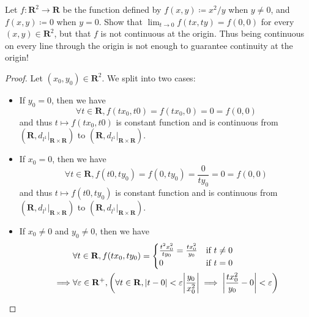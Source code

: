 \begin{exercise}\label{ex 2.2.12}
    Let \(f: \mathbf{R}^2 \to \mathbf{R}\) be the function defined by \(f(x, y) \coloneqq x^2 / y\) when \(y \neq 0\), and \(f(x, y) \coloneqq 0\) when \(y = 0\).
    Show that \(\lim_{t \to 0} f(tx, ty) = f(0, 0)\) for every \((x, y) \in \mathbf{R}^2\), but that \(f\) is not continuous at the origin.
    Thus being continuous on every line through the origin is not enough to guarantee continuity at the origin!
\end{exercise}

\begin{proof}
    Let \((x_0, y_0) \in \mathbf{R}^2\).
    We split into two cases:
    \begin{itemize}
        \item If \(y_0 = 0\), then we have
              \[
                  \forall t \in \mathbf{R}, f(t x_0, t0) = f(t x_0, 0) = 0 = f(0, 0)
              \]
              and thus \(t \mapsto f(t x_0, t0)\) is constant function and is continuous from \((\mathbf{R}, d_{l^1}|_{\mathbf{R} \times \mathbf{R}})\) to \((\mathbf{R}, d_{l^1}|_{\mathbf{R} \times \mathbf{R}})\).
        \item If \(x_0 = 0\), then we have
              \[
                  \forall t \in \mathbf{R}, f(t0, t y_0) = f(0, t y_0) = \frac{0}{t y_0} = 0 = f(0, 0)
              \]
              and thus \(t \mapsto f(t0, t y_0)\) is constant function and is continuous from \((\mathbf{R}, d_{l^1}|_{\mathbf{R} \times \mathbf{R}})\) to \((\mathbf{R}, d_{l^1}|_{\mathbf{R} \times \mathbf{R}})\).
        \item If \(x_0 \neq 0\) and \(y_0 \neq 0\), then we have
              \begin{align*}
                           & \forall t \in \mathbf{R}, f(t x_0, t y_0) = \begin{cases}
                                                                             \frac{t^2 x_0^2}{t y_0} = \frac{t x_0^2}{y_0} & \text{if } t \neq 0 \\
                                                                             0                                             & \text{if } t = 0
                                                                         \end{cases}                                                                           \\
                  \implies & \forall \varepsilon \in \mathbf{R}^+, \bigg(\forall t \in \mathbf{R}, \abs*{t - 0} < \varepsilon \abs*{\frac{y_0}{x_0^2}} \implies \abs*{\frac{t x_0^2}{y_0} - 0} < \varepsilon\bigg)     \\

\end{align*}
\end{itemize}
\end{proof}
